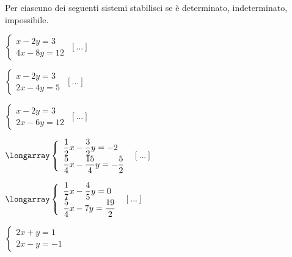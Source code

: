 


\begin{esercizio}
 \label{ese:22.31}
Per ciascuno dei seguenti sistemi stabilisci se è determinato,
indeterminato, impossibile.
\begin{multicols}{2}
\begin{enumeratea}
\item $\left\{\begin{array}{l}x-2y=3 \\4x-8y=12\end{array}\right.$
 \hfill $\left[...\right]$
\item $\left\{\begin{array}{l}x-2y=3 \\2x-4y=5\end{array}\right.$
 \hfill $\left[...\right]$
\item $\left\{\begin{array}{l}x-2y=3 \\2x-6y=12\end{array}\right.$
 \hfill $\left[...\right]$
\item $\longarray\left\{\begin{array}{l}
\dfrac{1}{2}x-\dfrac{3}{2}y=-2\\
\dfrac{5}{4}x-\dfrac{15}{4}y=-{\dfrac{5}{2}}\end{array}\right.$
 \hfill $\left[...\right]$
\item $\longarray\left\{\begin{array}{l}
\dfrac{1}{7}x-\dfrac{4}{5}y=0\\
\dfrac{5}{4}x-7y=\dfrac{19}{2}\end{array}\right.$
 \hfill $\left[...\right]$
\item $\left\{\begin{array}{l}2x+y=1 \\2x-y=-1\end{array}\right.$

\end{enumeratea}
\end{multicols}
\end{esercizio}
